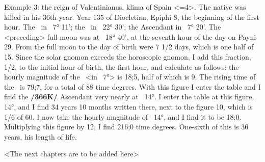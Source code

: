 Example 3: the reign of  Valentinianus, klima of Spain <=4>. The native was killed in his 36th year. Year 135 of Diocletian, Epiphi 8, the beginning of the first hour. The \Sun\, in \Cancer\, 7° 11'; the \Moon\, in \Aries\, 22° 30'; the Ascendant in \Cancer\, 7° 20'. The <preceding> full moon was at \Gemini\, 18° 40', at the seventh hour of the day on Payni 29. From the full moon to the day of birth were 7 1/2 days, which is one half of 15. Since the solar gnomon exceeds the horoscopic gnomon, I add this fraction, 1/2, to the initial hour of birth, the first hour, and calculate as follows: the hourly magnitude of the \Sun\, <in \Cancer\, 7°> is 18;5, half of which is 9. The rising time of the \Sun\, is 79;7, for a total of 88 time degrees. With this figure I enter the table and I find the \textbf{/366K/} Ascendant very nearly at \Cancer\, 14°. I enter the table at this figure, 14°, and I find 34 years 10 months written there, next to the figure 10, which is 1/6 of 60. I now take the hourly magnitude of \Cancer\, 14°, and I find it to be 18;0. Multiplying this figure by 12, I find 216;0 time degrees. One-sixth of this is 36 years, his length of life.

\partialsecbr

<The next chapters are to be added here>

\newpage